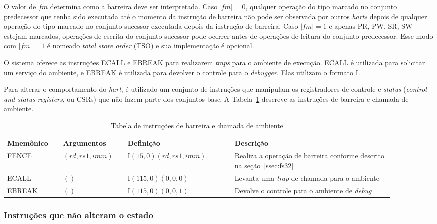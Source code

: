   O valor de $f\!m$ determina como a barreira deve ser interpretada.
  Caso $|f\!m| = 0$, qualquer operação do tipo marcado no conjunto
  predecessor que tenha sido executada até o momento da instrução de barreira não 
  pode ser observada por outros \emph{harts} depois de
  qualquer operação do tipo marcado no conjunto
  sucessor executada depois da instrução de barreira.
  Caso $|f\!m| = 1$ e apenas PR, PW, SR, SW
  estejam marcados, operações de escrita do conjunto sucessor
  pode ocorrer antes de operações de leitura do conjunto predecessor.
  Esse modo com $|f\!m| = 1$ é nomeado \emph{total store order} (TSO) e sua implementação é opcional.

  O sistema oferece as instruções ECALL e EBREAK para realizarem \emph{traps} para o ambiente de
  execução. ECALL é utilizada para solicitar um serviço do ambiente, e
  EBREAK é utilizada para devolver o controle para o \emph{debugger}. Elas utilizam o formato I.

  Para alterar o comportamento do \emph{hart}, é utilizado um conjunto de instruções que manipulam os
  registradores de controle e \emph{status} (\emph{control and status registers}, ou CSRs) que não
  fazem parte dos conjuntos base. A Tabela~\ref{tab:sys32} descreve as instruções de barreira e chamada de ambiente.

  \begin{table}
    \begin{tabular}{ |p{0.13\linewidth}||p{0.15\linewidth}|p{0.25\linewidth}|p{0.37\linewidth}| } 
      \hline
      Mnemônico & Argumentos & Definição & Descrição\\ \hline \hline

FENCE & $(rd, rs1, imm)$ & I$(15, 0)(rd, rs1, imm)$ & Realiza a operação de barreira conforme descrito na seção~\ref{ssec:fs32} \\ \hline
ECALL & $()$ & I$(115,0)(0,0,0)$ & Levanta uma \emph{trap} de chamada para o ambiente \\ \hline
EBREAK &  $()$ & I$(115,0)(0,0,1)$ & Devolve o controle para o ambiente de \emph{debug} \\ \hline
    \end{tabular}
  \caption{Tabela de instruções de barreira e chamada de ambiente \label{tab:sys32}}
  \end{table}

\subsubsection{Instruções que não alteram o estado}
\label{ssec:nop32}

